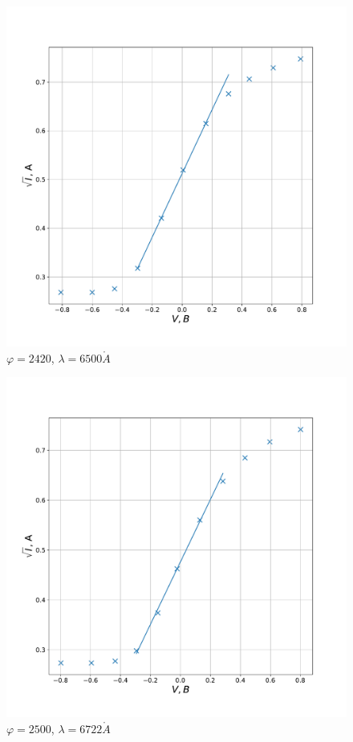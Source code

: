 \documentclass[a4paper, 12pt]{article}
\renewcommand{\phi}{\varphi}
\renewcommand{\AA}{\ensuremath{\mathring{A}}}
\begin{document}
\begin{figure}[!h]
    \centering
    \includegraphics[scale=0.35]{2420}
    \caption {$\phi = 2420$, $\lambda = 6500 \AA$}
\end{figure}

\begin{figure}[!h]
    \centering
    \includegraphics[scale=0.35]{2500}
    \caption {$\phi = 2500$, $\lambda = 6722 \AA$}
\end{figure}
\end{document}
